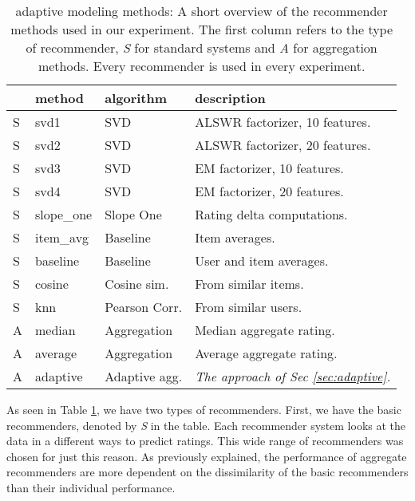 \begin{table}
  \caption[Adaptive Modeling Methods]{
    adaptive modeling methods: A short overview of the recommender methods
    used in our experiment. The first column refers to the type of recommender,
    \emph{S} for standard systems and \emph{A} for aggregation methods.
    Every recommender is used in every experiment. 
  }
  \setlength{\extrarowheight}{0.2em}
  \vspace{1em}
  \begin{tabular*}{0.48\textwidth}{ l l l l }
    \hline
    { } & \textbf{method} & \textbf{algorithm} & \textbf{description} \\
    \hline
    S & svd1          & SVD                   & ALSWR factorizer, 10 features. \\
    S & svd2          & SVD                   & ALSWR factorizer, 20 features. \\
    S & svd3          & SVD                   & EM factorizer, 10 features. \\
    S & svd4          & SVD                   & EM factorizer, 20 features. \\
    S & slope\_one    & Slope One             & Rating delta computations. \\
    S & item\_avg     & Baseline              & Item averages. \\ 
    S & baseline      & Baseline              & User and item averages.\\ 
    S & cosine   	    & Cosine sim.           & From similar items.\\ 
    S & knn       	  & Pearson Corr.         & From similar users.\\
    \hline
    A & median    	  & Aggregation           & Median aggregate rating. \\
    A & average    	  & Aggregation           & Average aggregate rating. \\
    A & adaptive      & Adaptive agg.         & \emph{The approach of Sec \ref{sec:adaptive}.} \\
    \hline
  \end{tabular*}
  \label{table:results:methods}
\end{table}

As seen in Table \ref{table:results:methods}, we have two types of recommenders.
First, we have the basic recommenders, denoted by \emph{S} in the table.
Each recommender system looks at the data in a different ways to predict ratings.
This wide range of recommenders was chosen for just this reason.
As previously explained, the performance of aggregate recommenders
are more dependent on the dissimilarity of the basic recommenders
than their individual performance.

